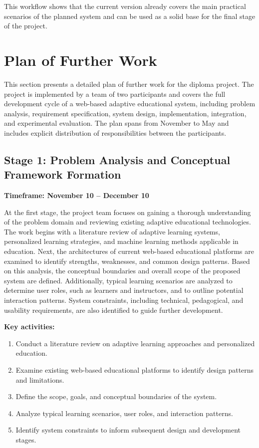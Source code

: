 \documentclass[a4paper,12pt]{extarticle}
\begin{document}
This workflow shows that the current version already covers the main practical scenarios of the planned system and can be used as a solid base for the final stage of the project.
\section{Plan of Further Work}

This section presents a detailed plan of further work for the diploma project. The project is implemented by a team of two participants and covers the full development cycle of a web-based adaptive educational system, including problem analysis, requirement specification, system design, implementation, integration, and experimental evaluation. The plan spans from November to May and includes explicit distribution of responsibilities between the participants.

\subsection{Stage 1: Problem Analysis and Conceptual Framework Formation}
\textbf{Timeframe: November 10 -- December 10}

At the first stage, the project team focuses on gaining a thorough understanding of the problem domain and reviewing existing adaptive educational technologies. The work begins with a literature review of adaptive learning systems, personalized learning strategies, and machine learning methods applicable in education. Next, the architectures of current web-based educational platforms are examined to identify strengths, weaknesses, and common design patterns. Based on this analysis, the conceptual boundaries and overall scope of the proposed system are defined. Additionally, typical learning scenarios are analyzed to determine user roles, such as learners and instructors, and to outline potential interaction patterns. System constraints, including technical, pedagogical, and usability requirements, are also identified to guide further development.  

\textbf{Key activities:}
\begin{enumerate}
    \item Conduct a literature review on adaptive learning approaches and personalized education.
    \item Examine existing web-based educational platforms to identify design patterns and limitations.
    \item Define the scope, goals, and conceptual boundaries of the system.
    \item Analyze typical learning scenarios, user roles, and interaction patterns.
    \item Identify system constraints to inform subsequent design and development stages.
\end{enumerate}
\end{document}
